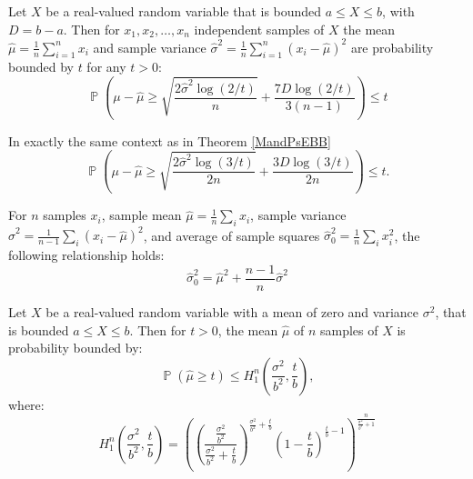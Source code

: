\documentclass[
10pt, %
a4paper, %
oneside, %
headinclude,footinclude, %
BCOR5mm, %
]{scrartcl}
\DeclareMathOperator{\p}{\mathbb{P}}
\begin{document}
\begin{theorem}\label{MandPsEBB}
Let $X$ be a real-valued random variable that is bounded $a\le X\le b$, with $D=b-a$.  Then for $x_1,x_2,\dots,x_n$ independent samples of $X$ the mean $\hat{\mu}=\frac{1}{n}\sum_{i=1}^nx_i$ and sample variance $\hat{\sigma}^2=\frac{1}{n}\sum_{i=1}^n(x_i-\hat{\mu})^2 $ are probability bounded by $t$ for any $t>0$:
\begin{equation}\label{maurersbound} 
    \p\left(\mu-\hat{\mu}\ge\sqrt{\frac{2\hat{\sigma}^2\log(2/t)}{n}}+\frac{7D\log(2/t)}{3(n-1)}\right)\le t
\end{equation}
\end{theorem}

\begin{theorem}[\cite{10.1007/978-3-540-75225-7_15}]\label{AudibertsEBB}
In exactly the same context as in Theorem \ref{MandPsEBB}
\begin{equation}
    \p\left(\mu-\hat{\mu}\ge\sqrt{\frac{2\hat{\sigma}^2\log(3/t)}{2n}} + \frac{3D\log(3/t)}{2n}\right) \le t.
    \end{equation}
\end{theorem}




\begin{theorem}\label{variance1}
For $n$ samples $x_i$, sample mean $\hat{\mu} = \frac{1}{n}\sum_ix_i$, sample variance $\hat{\sigma}^2=\frac{1}{n-1}\sum_i(x_i-\hat{\mu})^2$, and average of sample squares $\hat{\sigma}_0^2 = \frac{1}{n}\sum_ix_i^2$, the following relationship holds:
\[
\hat{\sigma}_0^2=\hat{\mu}^2+\frac{n-1}{n}\hat{\sigma}^2
\]
\end{theorem}



\begin{theorem}\label{hoeffdings1}
Let $X$ be a real-valued random variable with a mean of zero and variance $\sigma^2$, that is bounded $a\le X\le b$. 
Then for $t>0$, the mean $\hat{\mu}$ of $n$ samples of $X$ is probability bounded by:
\begin{equation}\label{eq_no2}\p(\hat{\mu}\ge t)\le H_1^n\left(\frac{\sigma^2}{b^2},\frac{t}{b}\right),
\end{equation}
where:
\begin{equation*}
H_1^n\left(\frac{\sigma^2}{b^2},\frac{t}{b}\right) =
\left(\left(\frac{\frac{\sigma^2}{b^2}}{\frac{\sigma^2}{b^2}+\frac{t}{b}}\right)^{\frac{\sigma^2}{b^2}+\frac{t}{b}}
\left(1-\frac{t}{b}\right)^{\frac{t}{b}-1}\right)^{\frac{n}{\frac{\sigma^2}{b^2}+1}}
\end{equation*}
\end{theorem}
\end{document}
